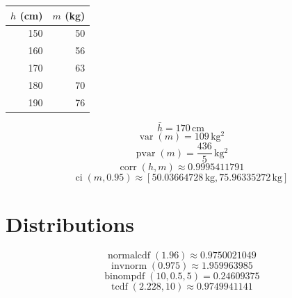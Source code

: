\documentclass[11pt,a4paper]{article}
\theoremstyle{plain}
\theoremstyle{definition}
\theoremstyle{remark}
\begin{document}
\begin{center}
\begin{tabular}{rr}
\toprule
$h$ (cm) & $m$ (kg) \\
\midrule
150 & 50 \\
160 & 56 \\
170 & 63 \\
180 & 70 \\
190 & 76 \\
\bottomrule
\end{tabular}
\end{center}
\begin{equation*}
  \bar{h} = 170\,\mathrm{cm}
\end{equation*}
\begin{equation*}
  \operatorname{var}(m) = 109\,\mathrm{kg^{2}}
\end{equation*}
\begin{equation*}
  \operatorname{pvar}(m) = \frac{436}{5}\,\mathrm{kg^{2}}
\end{equation*}
\begin{equation*}
  \operatorname{corr}(h, m) \approx 0.9995411791
\end{equation*}
\begin{equation*}
  \operatorname{ci}(m, 0.95) \approx [50.03664728\,\mathrm{kg}, 75.96335272\,\mathrm{kg}]
\end{equation*}
\section*{Distributions}

\begin{equation*}
  \operatorname{normalcdf}(1.96) \approx 0.9750021049
\end{equation*}
\begin{equation*}
  \operatorname{invnorm}(0.975) \approx 1.959963985
\end{equation*}
\begin{equation*}
  \operatorname{binompdf}(10, 0.5, 5) = 0.24609375
\end{equation*}
\begin{equation*}
  \operatorname{tcdf}(2.228, 10) \approx 0.9749941141
\end{equation*}
\end{document}
